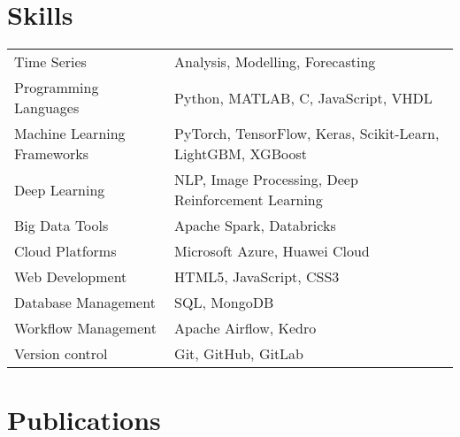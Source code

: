 \documentclass[a4paper,10pt]{article}
\begin{document}
\section{Skills}
\begin{tabularx}{\linewidth}{@{}l X@{}}
Time Series & Analysis, Modelling, Forecasting \\
Programming Languages & Python, MATLAB, C, JavaScript, VHDL\\
Machine Learning Frameworks & PyTorch, TensorFlow, Keras, Scikit-Learn, LightGBM, XGBoost\\
Deep Learning & NLP, Image Processing, Deep Reinforcement Learning\\
Big Data Tools & Apache Spark, Databricks\\
Cloud Platforms & Microsoft Azure, Huawei Cloud\\
Web Development & HTML5, JavaScript, CSS3\\
Database Management & SQL, MongoDB\\
Workflow Management & Apache Airflow, Kedro\\
Version control & Git, GitHub, GitLab\\
\end{tabularx}


\section{Publications}
\begin{refsection}
\nocite{*}
\printbibliography[heading=none]
\end{refsection}



\vfill
{}
\end{document}
